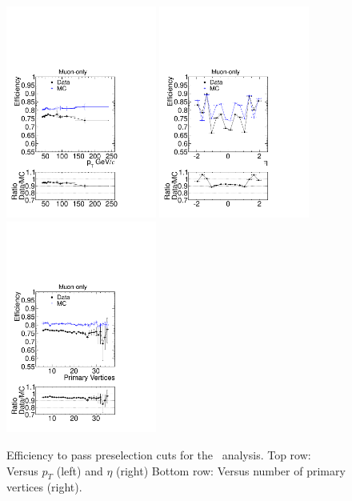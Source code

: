 \begin{figure}
 \begin{center}
  \includegraphics[clip=true, trim=0.0cm 0cm 1.4cm 0cm, width=0.44\textwidth]{figures/muonly/pteff_Comp}
  \includegraphics[clip=true, trim=0.0cm 0cm 1.4cm 0cm, width=0.44\textwidth]{figures/muonly/etaeff_Comp}
  \includegraphics[clip=true, trim=0.0cm 0cm 1.4cm 0cm, width=0.44\textwidth]{figures/muonly/PVeff_Comp}
 \end{center}
 \caption[Efficiency to pass preselection cuts for the \muononly\ analysis versus \pt, $\eta$, and number of primary vertices]
{Efficiency to pass preselection cuts for the \muononly\ analysis.
Top row: Versus $p_T$ (left) and $\eta$ (right)
Bottom row: Versus number of primary vertices (right).}
   \label{fig:MuOnlyTagProbeEff}
\end{figure}